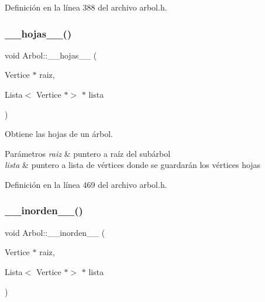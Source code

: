 Definición en la línea 388 del archivo arbol.\+h.

\mbox{\label{classArbol_aad97c679cb368931b2c6894b3dbcb60f}} 
\subsubsection{\texorpdfstring{\+\_\+\+\_\+hojas\+\_\+\+\_\+()}{\_\_hojas\_\_()}}
{\footnotesize\ttfamily void Arbol\+::\+\_\+\+\_\+hojas\+\_\+\+\_\+ (\begin{DoxyParamCaption}\item[{Vertice $\ast$}]{raiz,  }\item[{Lista$<$ Vertice $\ast$$>$ $\ast$}]{lista }\end{DoxyParamCaption})\hspace{0.3cm}{\ttfamily [protected]}}



Obtiene las hojas de un árbol. 


\begin{DoxyParams}{Parámetros}
{\em raiz} & puntero a raíz del subárbol \\
\hline
{\em lista} & puntero a lista de vértices donde se guardarán los vértices hojas \\
\hline
\end{DoxyParams}


Definición en la línea 469 del archivo arbol.\+h.

\mbox{\label{classArbol_ae3dc89f7db1fb9b54bcc2489eb1d9542}} 
\subsubsection{\texorpdfstring{\+\_\+\+\_\+inorden\+\_\+\+\_\+()}{\_\_inorden\_\_()}}
{\footnotesize\ttfamily void Arbol\+::\+\_\+\+\_\+inorden\+\_\+\+\_\+ (\begin{DoxyParamCaption}\item[{Vertice $\ast$}]{raiz,  }\item[{Lista$<$ Vertice $\ast$$>$ $\ast$}]{lista }\end{DoxyParamCaption})\hspace{0.3cm}{\ttfamily [protected]}}



